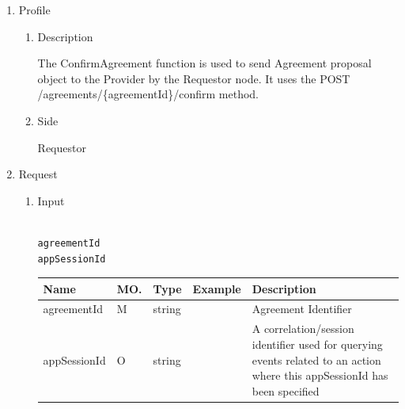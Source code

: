 \begin{enumerate}

\item Profile

\begin{enumerate}

\item Description

The ConfirmAgreement function is used to send Agreement proposal object to the Provider by the Requestor node. 
It uses the POST /agreements/\{agreementId\}/confirm method.

\item Side

Requestor

\end{enumerate}

\item Request

\begin{enumerate}

\item Input

\begin{tcolorbox}[boxrule=0pt, frame empty]
\begin{verbatim}

agreementId
appSessionId

\end{verbatim}
\end{tcolorbox}


\begin{center}
\begin{tabular}{|p{3cm}|l|p{3cm}|p{3cm}|p{4cm}|} 
\hline
\rowcolor{lightgray}	Name	& MO.	& Type	& Example & 	Description \\
\hline

agreementId		& M & 	string				&		& 	Agreement Identifier \\
\hline

appSessionId	& O	& 	string				&		&	A correlation/session identifier used for querying events related to an action where this appSessionId has been specified 	\\ 
\hline

\end{tabular}
\end{center}


\end{enumerate}
\end{enumerate}
